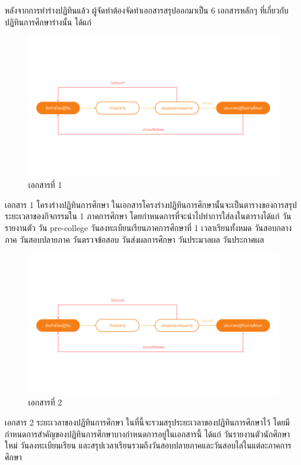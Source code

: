 \par หลังจากการทำร่างปฏิทินแล้ว ผู้จัดทำต้องจัดทำเอกสารสรุปออกมาเป็น 6 เอกสารหลักๆ ที่เกี่ยวกับปฏิทินการศึกษาร่างนั้น ได้แก่

\begin{figure}[h]
    \centering
    \includegraphics[width=1\textwidth]{create-draft.png}
    \caption{เอกสารที่ 1}
    \label{fig:academic-draft}
\end{figure}

\par เอกสาร	1 โครงร่างปฏิทินการศึกษา ในเอกสารโครงร่างปฏิทินการศึกษานั้นจะเป็นตารางของการสรุประยะเวลาของกิจกรรมใน 1 ภาคการศึกษา
โดยกำหนดการที่จะนำไปทำการใส่ลงในตารางได้แก่ วันรายงานตัว วัน pre-college วันลงทะเบียนเรียนภาคการศึกษาที่ 1 เวลาเรียนทั้งหมด วันสอบกลางภาค วันสอบปลายภาค วันตรวจข้อสอบ วันส่งผลการศึกษา วันประมวลผล วันประกาศผล \enskip

\begin{figure}[h]
    \centering
    \includegraphics[width=1\textwidth]{create-draft.png}
    \caption{เอกสารที่ 2}
    \label{fig:duration-calendar}
\end{figure}
\par เอกสาร 2 ระยะเวลาของปฏิทินการศึกษา
ในที่นี้จะรวมสรุประยะเวลาของปฏิทินการศึกษาไว้ โดยมีกำหนดการสำคัญของปฏิทินการศึกษาบางกำหนดการอยู่ในเอกสารนี้ ได้แก่ วันรายงานตัวนักศึกษาใหม่ วันลงทะเบียนเรียน และสรุปเวลาเรียนรวมถึงวันสอบปลายภาคและวันสอบไล่ในแต่ละภาคการศึกษา \enskip

